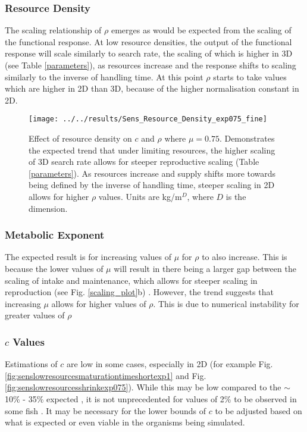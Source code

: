 \documentclass[a4paper, 11pt, hidelinks]{article} %
\begin{document}
	\subsubsection{Resource Density}
	The scaling relationship of $\rho$ emerges as would be expected from the scaling of the functional response.  At low resource densities, the output of the functional response will scale similarly to search rate, the scaling of which is higher in 3D (see Table \ref{parameters}), as resources increase and the response shifts to scaling similarly to the inverse of handling time.  At this point $\rho$ starts to take values which are higher in 2D than 3D, because of the higher normalisation constant in 2D.
	
	\begin{figure}[h!]
		\centering
		\texttt{[image: ../../results/Sens\_Resource\_Density\_exp075\_fine]}
		\caption{Effect of resource density on $c$ and $\rho$ where $\mu = 0.75$.  Demonstrates the expected trend that under limiting resources, the higher scaling of 3D search rate  allows for steeper reproductive scaling (Table \ref{parameters}).  As resources increase and supply shifts more towards being defined by the inverse of handling time, steeper scaling in 2D allows for higher $\rho$ values.  Units are kg/m$^D$, where $D$ is the dimension.}
		\label{fig:sensresourcedensityexp075fine}
	\end{figure}

	\subsubsection{Metabolic Exponent}
	The expected result is for increasing values of $\mu$ for $\rho$ to also increase.  This is because the lower values of $\mu$ will result in there being a larger gap between the scaling of intake and maintenance, which allows for steeper scaling in reproduction (see Fig. \ref{scaling_plot}b) \parencite{Marshall2019}.  
	However, the trend suggests that increasing $\mu$ allows for higher values of $\rho$.  This is due to numerical instability for greater values of $ \rho $
		
	\subsubsection{$c$ Values}
	Estimations of $c$ are low in some cases, especially in 2D (for example Fig. \ref{fig:senslowresourcesmaturationtimeshortexp1} and Fig. \ref{fig:senslowresourcesshrinkexp075}).  While this may be low compared to the $\sim$10\% - 35\% expected \parencite{Benoit2018, Fontoura2009, Roff1983, Wootton1985}, it is not unprecedented for values of 2\% to be observed in some fish \parencite{Gunderson1997}.  
	It may be necessary for the lower bounds of $c$ to be adjusted based on what is expected or even viable in the organisms being simulated.
		
\end{document}
